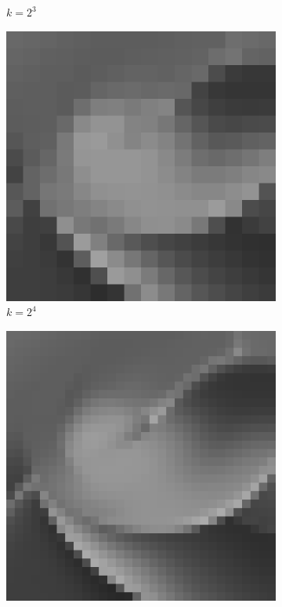 \begin{figure}[H]
\begin{subfigure}[b]{0.3\textwidth}
        \caption{$k = 2^3$}
    \end{subfigure}
    \hfill
    \begin{subfigure}[b]{0.3\textwidth}
        \centering
        \includegraphics[width=\textwidth]{problem2/low_freq_16.bmp}
        \caption{$k = 2^4$}
    \end{subfigure}
    \hfill
    \begin{subfigure}[b]{0.3\textwidth}
        \centering
        \includegraphics[width=\textwidth]{problem2/low_freq_32.bmp}

\end{subfigure}
\end{figure}
